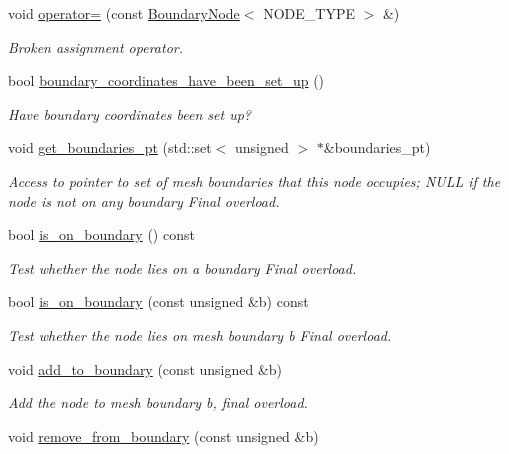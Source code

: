 \begin{DoxyCompactItemize}
void \hyperlink{classoomph_1_1BoundaryNode_afe5cfe47e6b469f30da29e9921c0f39d}{operator=} (const \hyperlink{classoomph_1_1BoundaryNode}{Boundary\+Node}$<$ N\+O\+D\+E\+\_\+\+T\+Y\+PE $>$ \&)
\begin{DoxyCompactList}\small\item\em Broken assignment operator. \end{DoxyCompactList}\item 
bool \hyperlink{classoomph_1_1BoundaryNode_abf4d213105e2a484dab50e718a8ae654}{boundary\+\_\+coordinates\+\_\+have\+\_\+been\+\_\+set\+\_\+up} ()
\begin{DoxyCompactList}\small\item\em Have boundary coordinates been set up? \end{DoxyCompactList}\item 
void \hyperlink{classoomph_1_1BoundaryNode_af0ed7828ec05bded2cd8d1c5576fbe5d}{get\+\_\+boundaries\+\_\+pt} (std\+::set$<$ unsigned $>$ $\ast$\&boundaries\+\_\+pt)
\begin{DoxyCompactList}\small\item\em Access to pointer to set of mesh boundaries that this node occupies; N\+U\+LL if the node is not on any boundary Final overload. \end{DoxyCompactList}\item 
bool \hyperlink{classoomph_1_1BoundaryNode_a70e488e087d1da3ec13c4412935e5644}{is\+\_\+on\+\_\+boundary} () const
\begin{DoxyCompactList}\small\item\em Test whether the node lies on a boundary Final overload. \end{DoxyCompactList}\item 
bool \hyperlink{classoomph_1_1BoundaryNode_afd7aca2edeec2464ed080163b90d26a1}{is\+\_\+on\+\_\+boundary} (const unsigned \&b) const
\begin{DoxyCompactList}\small\item\em Test whether the node lies on mesh boundary b Final overload. \end{DoxyCompactList}\item 
void \hyperlink{classoomph_1_1BoundaryNode_aa2fa81a38645fe14ccea5b10c2985f38}{add\+\_\+to\+\_\+boundary} (const unsigned \&b)
\begin{DoxyCompactList}\small\item\em Add the node to mesh boundary b, final overload. \end{DoxyCompactList}\item 
void \hyperlink{classoomph_1_1BoundaryNode_a95b9f27994cc3cd64d33ccb287bbd92a}{remove\+\_\+from\+\_\+boundary} (const unsigned \&b)

\end{DoxyCompactItemize}
